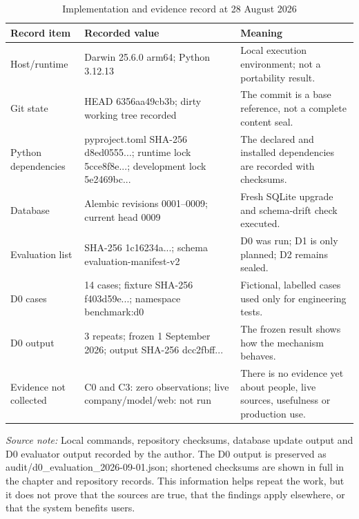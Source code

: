 \clearpage
\begin{table}[p]
  \centering
  \scriptsize
  \setlength{\tabcolsep}{4pt}
  \renewcommand{\arraystretch}{1.08}
  \begin{tabularx}{\textwidth}{@{}P{0.22\textwidth}P{0.31\textwidth}Y@{}}
    \toprule
    \textbf{Record item} & \textbf{Recorded value} & \textbf{Meaning} \\
    \midrule
    Host/runtime & Darwin 25.6.0 arm64; Python 3.12.13 & Local execution environment; not a portability result. \\
    Git state & HEAD \textnormal{6356aa49cb3b}; dirty working tree recorded & The commit is a base reference, not a complete content seal. \\
    Python dependencies & \textnormal{pyproject.toml} SHA-256 \textnormal{d8ed0555...}; runtime lock \textnormal{5cce8f8e...}; development lock \textnormal{5e2469bc...} & The declared and installed dependencies are recorded with checksums. \\
    Database & Alembic revisions 0001--0009; current head 0009 & Fresh SQLite upgrade and schema-drift check executed. \\
    Evaluation list & SHA-256 \textnormal{1c16234a...}; schema \textnormal{evaluation-manifest-v2} & D0 was run; D1 is only planned; D2 remains sealed. \\
    D0 cases & 14 cases; fixture SHA-256 \textnormal{f403d59e...}; namespace \textnormal{benchmark:d0} & Fictional, labelled cases used only for engineering tests. \\
    D0 output & 3 repeats; frozen 1 September 2026; output SHA-256 \textnormal{dcc2fbff...} & The frozen result shows how the mechanism behaves. \\
    Evidence not collected & C0 and C3: zero observations; live company/model/web: not run & There is no evidence yet about people, live sources, usefulness or production use. \\
    \bottomrule
  \end{tabularx}

  \caption{Implementation and evidence record at 28 August 2026}
  \label{tab:eval-implementation-snapshot}

  \vspace{4pt}
  \parbox{\textwidth}{\scriptsize
    \textit{Source note:} Local commands, repository checksums, database update output and D0
    evaluator output recorded by the author. The D0 output is preserved as
    \textnormal{audit/d0\_evaluation\_2026-09-01.json}; shortened checksums are shown in full in the chapter
    and repository records. This information helps repeat the work, but it does not prove that the
    sources are true, that the findings apply elsewhere, or that the system benefits users.}
\end{table}
\clearpage
